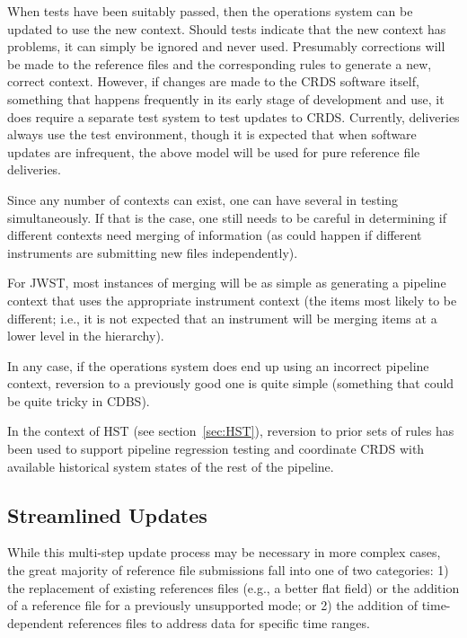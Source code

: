 \documentclass[final,authoryear,5p,times,twocolumn]{elsarticle}
\begin{document}
When tests have been suitably passed, then the operations system can be updated
to use the new context. Should tests indicate that the new context has
problems, it can simply be ignored and never used. Presumably corrections will
be made to the reference files and the corresponding rules to generate a new,
correct context. However, if changes are made to the CRDS software itself,
something that happens frequently in its early stage of development and use,
it does require a separate test system to test updates to CRDS. Currently, 
deliveries always use the test environment, though it is expected that when
software updates are infrequent, the above model will be used for pure
reference file deliveries.

Since any number of contexts can exist, one can have several in testing
simultaneously. If that is the case, one still needs to be careful in
determining if different contexts need merging of information (as could happen
if different instruments are submitting new files independently).

For JWST, most instances of merging will be as simple as generating a
pipeline context that uses the appropriate instrument context (the items
most likely to be different; i.e., it is not expected that an instrument 
will be merging items at a lower level in the hierarchy).

In any case, if the operations system does end up using an incorrect pipeline
context, reversion to a previously good one is quite simple (something that
could be quite tricky in CDBS).

In the context of HST (see section~\ref{sec:HST}), reversion to prior sets of 
rules has been used to
support pipeline regression testing and coordinate CRDS with available
historical system states of the rest of the pipeline.

\subsection{Streamlined Updates}

While this multi-step update process may be necessary in more complex cases, the
great majority of reference file submissions fall into one of two categories:
1) the replacement of existing references files (e.g., a better flat field) or
the addition of a reference file for a previously unsupported mode; or 2) the
addition of time-dependent references files to address data for specific time
ranges.
\end{document}
